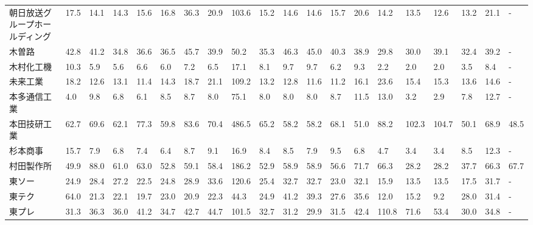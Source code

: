\begin{tabular}{llllllllllllllllllll}
朝日放送グループホールディング &   17.5 &   14.1 &      14.3 &      15.6 &       16.8 &    36.3 &    20.9 &    103.6 &    15.2 &    14.6 &   14.6 &   15.7 &    20.6 &    14.2 &    13.5 &   12.6 &   13.2 &    21.1 &      - \\
木曽路             &   42.8 &   41.2 &      34.8 &      36.6 &       36.5 &    45.7 &    39.9 &     50.2 &    35.3 &    46.3 &   45.0 &   40.3 &    38.9 &    29.8 &    30.0 &   39.1 &   32.4 &    39.2 &      - \\
木村化工機           &   10.3 &    5.9 &       5.6 &       6.6 &        6.0 &     7.2 &     6.5 &     17.1 &     8.1 &     9.7 &    9.7 &    6.2 &     9.3 &     2.2 &     2.0 &    2.0 &    3.5 &     8.4 &      - \\
未来工業            &   18.2 &   12.6 &      13.1 &      11.4 &       14.3 &    18.7 &    21.1 &    109.2 &    13.2 &    12.8 &   11.6 &   11.2 &    16.1 &    23.6 &    15.4 &   15.3 &   13.6 &    14.6 &      - \\
本多通信工業          &    4.0 &    9.8 &       6.8 &       6.1 &        8.5 &     8.7 &     8.0 &     75.1 &     8.0 &     8.0 &    8.0 &    8.7 &    11.5 &    13.0 &     3.2 &    2.9 &    7.8 &    12.7 &      - \\
本田技研工業          &   62.7 &   69.6 &      62.1 &      77.3 &       59.8 &    83.6 &    70.4 &    486.5 &    65.2 &    58.2 &   58.2 &   68.1 &    51.0 &    88.2 &   102.3 &  104.7 &   50.1 &    68.9 &   48.5 \\
杉本商事            &   15.7 &    7.9 &       6.8 &       7.4 &        6.4 &     8.7 &     9.1 &     16.9 &     8.4 &     8.5 &    7.9 &    9.5 &     6.8 &     4.7 &     3.4 &    3.4 &    8.5 &    12.3 &      - \\
村田製作所           &   49.9 &   88.0 &      61.0 &      63.0 &       52.8 &    59.1 &    58.4 &    186.2 &    52.9 &    58.9 &   58.9 &   56.6 &    71.7 &    66.3 &    28.2 &   28.2 &   37.7 &    66.3 &   67.7 \\
東ソー             &   24.9 &   28.4 &      27.2 &      22.5 &       24.8 &    28.9 &    33.6 &    120.6 &    25.4 &    32.7 &   32.7 &   23.0 &    32.1 &    15.9 &    13.5 &   13.5 &   17.5 &    31.7 &      - \\
東テク             &   64.0 &   21.3 &      22.1 &      19.7 &       23.0 &    20.9 &    22.3 &     44.3 &    24.9 &    41.2 &   39.3 &   27.6 &    35.6 &    12.0 &    15.2 &    9.2 &   28.0 &    31.4 &      - \\
東プレ             &   31.3 &   36.3 &      36.0 &      41.2 &       34.7 &    42.7 &    44.7 &    101.5 &    32.7 &    31.2 &   29.9 &   31.5 &    42.4 &   110.8 &    71.6 &   53.4 &   30.0 &    34.8 &      - \\

\end{tabular}
